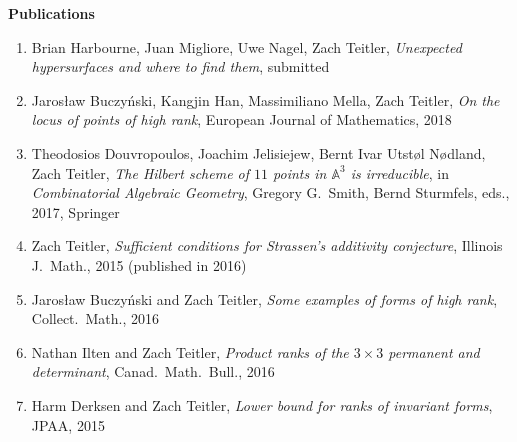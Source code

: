 \documentclass[12pt]{article}
\begin{document}





\textbf{Publications}
\begin{enumerate}

\item Brian Harbourne, Juan Migliore, Uwe Nagel, Zach Teitler,
\emph{Unexpected hypersurfaces and where to find them},
submitted

\item Jaros{\l}aw Buczy\'nski, Kangjin Han, Massimiliano Mella, Zach Teitler,
\emph{On the locus of points of high rank},
European Journal of Mathematics, 2018

\item Theodosios Douvropoulos, Joachim Jelisiejew, Bernt Ivar Utst{\o}l N{\o}dland, Zach Teitler,
\emph{The Hilbert scheme of $11$ points in $\mathbb{A}^3$ is irreducible},
in \emph{Combinatorial Algebraic Geometry}, Gregory G.\ Smith, Bernd Sturmfels, eds., 2017, Springer

\item Zach Teitler,
\emph{Sufficient conditions for Strassen's additivity conjecture},
Illinois J.\ Math.,
2015
(published in 2016)

\item Jaros{\l}aw Buczy\'nski and Zach Teitler,
\emph{Some examples of forms of high rank},
Collect.\ Math.,
2016

\item Nathan Ilten and Zach Teitler,
\emph{Product ranks of the $3 \times 3$ permanent and determinant},
Canad.\ Math.\ Bull.,
2016

\item Harm Derksen and Zach Teitler,
\emph{Lower bound for ranks of invariant forms},
JPAA,
2015


\end{enumerate}
\end{document}
